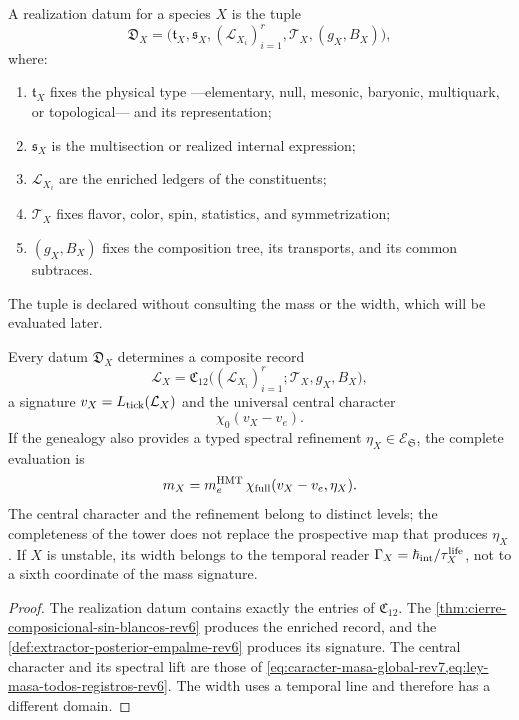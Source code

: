 \begin{definition}
\label{def:dato-realizacion-fisica-rev6}
A realization datum for a species \(X\) is the tuple
\[
 \mathfrak D_X=
 \bigl(
 \mathfrak t_X,\mathfrak s_X,
 (\mathcal L_{X_i})_{i=1}^{r},
 \mathcal T_X,(g_X,B_X)
 \bigr),
\]
where:
\begin{enumerate}
 \item \(\mathfrak t_X\) fixes the physical type ---elementary, null, mesonic,
 baryonic, multiquark, or topological--- and its representation;
 \item \(\mathfrak s_X\) is the multisection or realized internal expression;
 \item \(\mathcal L_{X_i}\) are the enriched ledgers of the
 constituents;
 \item \(\mathcal T_X\) fixes flavor, color, spin, statistics, and
 symmetrization;
 \item \((g_X,B_X)\) fixes the composition tree, its transports, and its
 common subtraces.
\end{enumerate}
The tuple is declared without consulting the mass or the width, which will be evaluated later.
\end{definition}

\begin{proposition}
\label{prop:realizacion-compuesta-ley-unica-rev6}
Every datum \(\mathfrak D_X\) determines a composite record
\[
 \mathcal L_X
 =\mathfrak C_{12}
   \bigl((\mathcal L_{X_i})_{i=1}^{r};
         \mathcal T_X,g_X,B_X\bigr),
\]
a signature \(v_X=L_{\rm tick}(\mathcal L_X)\) and the universal central character
\[
 \chi_0(v_X-v_e).
\]
If the genealogy also provides a typed spectral refinement
\(\eta_X\in\mathcal E_{\mathfrak S}\), the complete evaluation is
\[
 m_X
 =m_e^{\rm HMT}\,
   \chi_{\rm full}(v_X-v_e,\eta_X).
\]
The central character and the refinement belong to distinct levels; the
completeness of the tower does not replace the prospective map that produces
\(\eta_X\).
If \(X\) is unstable, its width belongs to the temporal reader
\(\Gamma_X=\hbar_{\rm int}/\tau_X^{\rm life}\), not to a sixth coordinate of
the mass signature.
\end{proposition}

\begin{proof}
The realization datum contains exactly the entries of
\(\mathfrak C_{12}\). The
\cref{thm:cierre-composicional-sin-blancos-rev6} produces the enriched
record, and the \cref{def:extractor-posterior-empalme-rev6} produces its
signature. The central character and its spectral lift are those of
\cref{eq:caracter-masa-global-rev7,eq:ley-masa-todos-registros-rev6}. The
width uses a temporal line and therefore has a different domain.
\end{proof}

